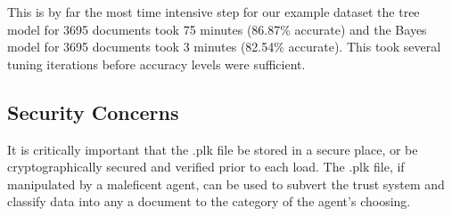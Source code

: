 This is by far the most time intensive step for our example dataset the tree
model for 3695 documents took 75 minutes (86.87\% accurate) and the Bayes
model for 3695 documents took 3 minutes (82.54\% accurate). This took several
tuning iterations before accuracy levels were sufficient. 

\subsection{Security Concerns}
It is critically important that the .plk file be stored in a secure place, or be
cryptographically secured and verified prior to each load. The .plk file, if
manipulated by a maleficent agent, can be used to subvert the trust system and
classify data into any a document to the category of the agent's choosing.  


